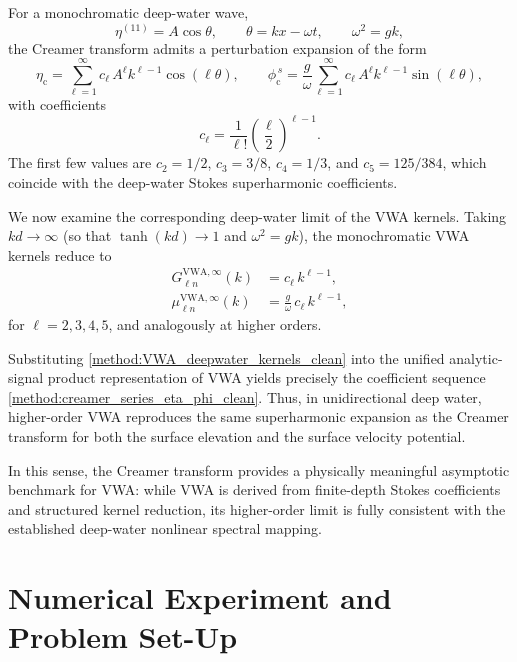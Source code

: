 \documentclass[lineno]{JFM-FLM_Au}
\begin{document}
For a monochromatic deep-water wave,
\[
\eta^{(11)}=A\cos\theta,
\qquad 
\theta=kx-\omega t,
\qquad 
\omega^2=gk,
\]
the Creamer transform admits a perturbation expansion of the form
\begin{equation}\label{method:creamer_series_eta_phi_clean}
\eta_{\mathrm{c}}
= \sum_{\ell=1}^{\infty} c_\ell\,A^\ell k^{\ell-1}\cos(\ell\theta),
\qquad
\phi_{\mathrm{c}}^{\,s}
= \frac{g}{\omega}
\sum_{\ell=1}^{\infty} c_\ell\,A^\ell k^{\ell-1}\sin(\ell\theta),
\end{equation}
with coefficients
\begin{equation}\label{method:creamer_coeff_cl_clean}
c_\ell=\frac{1}{\ell!}\left(\frac{\ell}{2}\right)^{\ell-1}.
\end{equation}
The first few values are $c_2=1/2$, $c_3=3/8$, $c_4=1/3$, and $c_5=125/384$, which coincide with the deep-water Stokes superharmonic coefficients.

We now examine the corresponding deep-water limit of the VWA kernels. 
Taking $kd\to\infty$ (so that $\tanh(kd)\to 1$ and $\omega^2=gk$), the monochromatic VWA kernels reduce to
\begin{subequations}\label{method:VWA_deepwater_kernels_clean}
\begin{align}
G^{\mathrm{VWA},\infty}_{\ell n}(k)
&= c_\ell\,k^{\ell-1},
\\
\mu^{\mathrm{VWA},\infty}_{\ell n}(k)
&= \frac{g}{\omega}\,c_\ell\,k^{\ell-1},
\end{align}
\end{subequations}
for $\ell=2,3,4,5$, and analogously at higher orders.

Substituting \eqref{method:VWA_deepwater_kernels_clean} into the unified analytic-signal product representation of VWA yields precisely the coefficient sequence \eqref{method:creamer_series_eta_phi_clean}. 
Thus, in unidirectional deep water, higher-order VWA reproduces the same superharmonic expansion as the Creamer transform for both the surface elevation and the surface velocity potential.

In this sense, the Creamer transform provides a physically meaningful asymptotic benchmark for VWA: while VWA is derived from finite-depth Stokes coefficients and structured kernel reduction, its higher-order limit is fully consistent with the established deep-water nonlinear spectral mapping.


\section{Numerical Experiment and Problem Set-Up}\label{sec:numericals_set_up}
\end{document}
